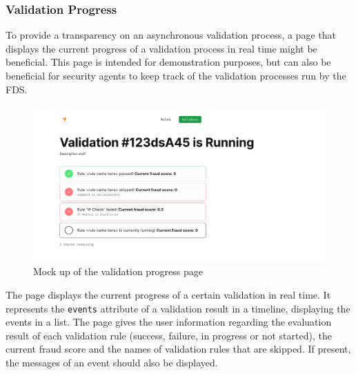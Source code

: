\subsubsection{Validation Progress}

To provide a transparency on an asynchronous validation process, a page that displays the current progress of a validation process in real time might be beneficial. This page is intended for demonstration purposes, but can also be beneficial for security agents to keep track of the validation processes run by the FDS.

\begin{figure}[!h]
 \includegraphics[width=\textwidth]{diagrams/mockup_validation_progress.png}
 \caption{Mock up of the validation progress page}
\end{figure}

The page displays the current progress of a certain validation in real time. It represents the \verb;events; attribute of a validation result in a timeline, displaying the events in a list. The page gives the user information regarding the evaluation result of each validation rule (success, failure, in progress or not started), the current fraud score and the names of validation rules that are skipped. If present, the messages of an event should also be displayed. 